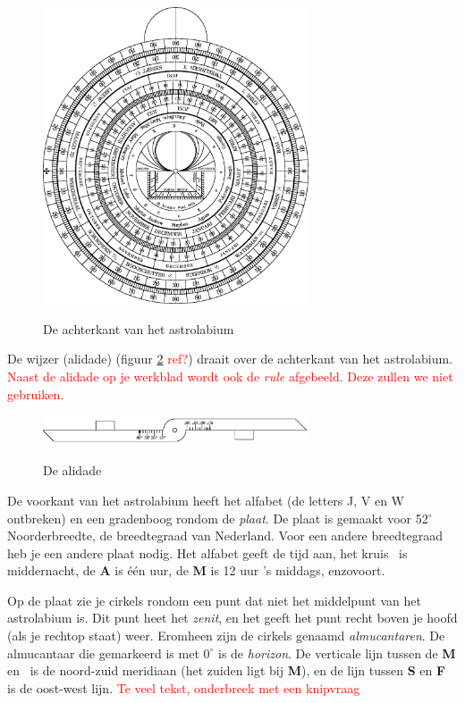 \begin{figure}
\centering
 \includegraphics[width=0.7\textwidth]{astrolabiumNL/mother_back.eps}
 \label{astrolabe-back}
 \caption{De achterkant van het astrolabium}
\end{figure}

De wijzer (alidade) (figuur \ref{alidade} \textcolor{red}{ref?}) draait over de achterkant van het astrolabium. \textcolor{red}{Naast de alidade op je werkblad wordt ook de \textit{rule} afgebeeld. Deze zullen we niet gebruiken.}

\begin{figure}
\centering
 \includegraphics[width=0.7\textwidth]{astrolabiumNL/alidade}
 \label{alidade}
 \caption{De alidade}
\end{figure}

De voorkant van het astrolabium heeft het alfabet (de letters J, V en W ontbreken) en een gradenboog rondom de \textit{plaat}. De plaat is gemaakt voor 52$^\circ$ Noorderbreedte, de breedtegraad van Nederland. Voor een andere breedtegraad heb je een andere plaat nodig. Het alfabet geeft de tijd aan, het kruis \kreuz\ is middernacht, de \textbf{A} is \'e\'en uur, de \textbf{M} is 12 uur 's middags, enzovoort.

Op de plaat zie je cirkels rondom een punt dat niet het middelpunt van het astrolabium is. Dit punt heet het \textit{zenit}, en het geeft het punt recht boven je hoofd (als je rechtop staat) weer. Eromheen zijn de cirkels genaamd \textit{almucantaren}. De almucantaar die gemarkeerd is met $0^\circ$ is de \textit{horizon}. De verticale lijn tussen de \textbf{M} en \kreuz\ is de noord-zuid meridiaan (het zuiden ligt bij \textbf{M}), en de lijn tussen \textbf{S} en \textbf{F} is de oost-west lijn. \textcolor{red}{Te veel tekst, onderbreek met een knipvraag}

